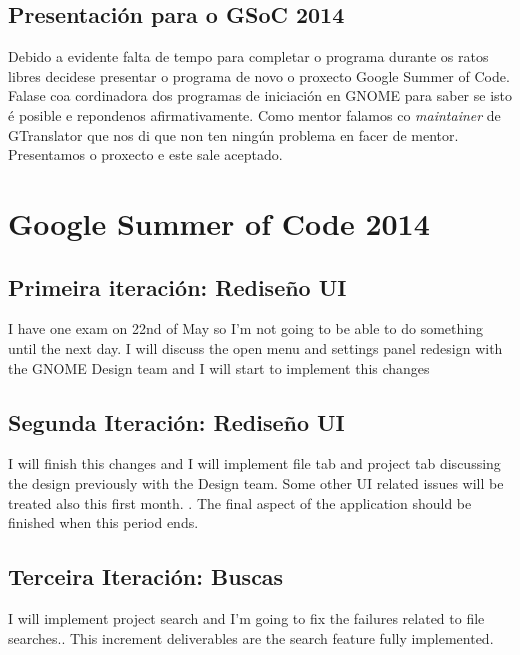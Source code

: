 \subsection{Presentación para o GSoC 2014}
Debido a evidente falta de tempo para completar o programa durante os ratos libres decidese presentar o programa de novo o proxecto Google Summer of Code. Falase coa cordinadora dos programas de iniciación en GNOME para saber se isto é posible e repondenos afirmativamente. Como mentor falamos co \emph{maintainer} de GTranslator que nos di que non ten ningún problema en facer de mentor. Presentamos o proxecto e este sale aceptado.

\section{Google Summer of Code 2014}


\subsection{Primeira iteración: Rediseño UI}

I have one exam on 22nd of May so I’m not going to be able to do something until the next day. I will discuss the open menu and settings panel redesign with the GNOME Design team and I will start to implement this changes 

\subsection{Segunda Iteración: Rediseño UI}

I will finish this changes and I will implement file tab and project tab discussing the design previously with the Design team.  Some other UI related issues will be treated also this first month. . The final aspect of the application should be finished when this period ends.

\subsection{Terceira Iteración: Buscas}

I will implement project search and I’m going to fix the failures related to file searches.. This increment deliverables are the search feature fully implemented.

